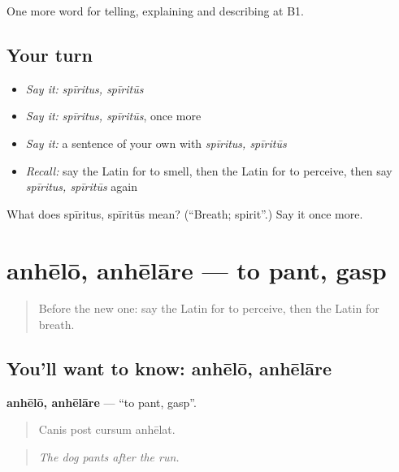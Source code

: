\begin{grammarlens}[title={What you've built}]
One more word for telling, explaining and describing at B1.
\end{grammarlens}

\subsection*{Your turn}
\begin{itemize}
\raggedright
  \item \emph{Say it:} \emph{spīritus, spīritūs}
  \item \emph{Say it:} \emph{spīritus, spīritūs}, once more
  \item \emph{Say it:} a sentence of your own with \emph{spīritus, spīritūs}
  \item \emph{Recall:} say the Latin for to smell, then the Latin for to perceive, then say \emph{spīritus, spīritūs} again
\end{itemize}

\begin{tcolorbox}[breakable,colback=teal!4,colframe=teal!35!black,title={Before you move on}]
What does spīritus, spīritūs mean? (\textquotedblleft{}Breath; spirit\textquotedblright{}.) Say it once more.
\end{tcolorbox}
\section[anhēlō, anhēlāre]{anhēlō, anhēlāre — to pant, gasp}

\label{lesson:LA-C520-anhelo}



\begin{quote}
Before the new one: say the Latin for to perceive, then the Latin for breath.
\end{quote}

\subsection*{You'll want to know: anhēlō, anhēlāre}
\textbf{anhēlō, anhēlāre} — \textquotedblleft{}to pant, gasp\textquotedblright{}.

\begin{quote}
Canis post cursum anhēlat.
\end{quote}

\begin{quote}
\emph{The dog pants after the run.}
\end{quote}

